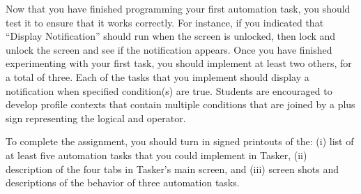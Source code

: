 Now that you have finished programming your first automation task, you should test it to ensure that it works correctly.
For instance, if you indicated that ``Display Notification'' should run when the screen is unlocked, then lock and
unlock the screen and see if the notification appears.  Once you have finished experimenting with your first task, you
should implement at least two others, for a total of three. Each of the tasks that you implement should display a
notification when specified condition(s) are true.  Students are encouraged to develop profile contexts that contain
multiple conditions that are joined by a plus sign representing the logical and operator. 


To complete the assignment, you should turn in signed printouts of the: (i) list of at least five automation tasks
that you could implement in Tasker, (ii) description of the four tabs in Tasker's main screen, and (iii) screen shots
and descriptions of the behavior of three automation tasks.


